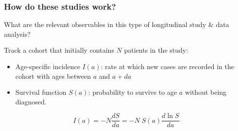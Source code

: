 \documentclass{beamer}
\begin{document}
\begin{frame}

\end{frame}

\begin{frame}
    \frametitle{How do these studies work?}

    What are the relevant observables in this type of longitudinal study \& data
    analysis? 

    Track a cohort that initially contains $N$ patients in the study:

    \begin{itemize}
        \item Age-specific incidence $I(a)$: rate at which new cases are
        recorded in the cohort with ages between $a$ and $a + da$
        \item Survival function $S(a)$: probability to survive to age $a$
        without being diagnosed.
    \end{itemize}

    \begin{equation}
        I(a) = -N \frac{dS}{da} = -N\; S(a) \frac{d \ln S}{da}
    \end{equation}
\end{frame}
\end{document}
